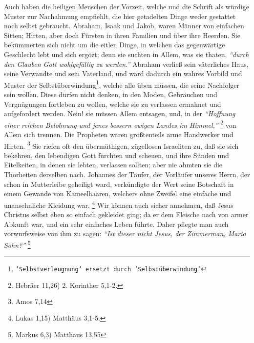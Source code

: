 Auch haben die heiligen Menschen der Vorzeit, welche und die Schrift als würdige
Muster zur Nachahmung empfiehlt, die hier getadelten Dinge weder gestattet noch
selbst gebraucht. Abraham, Isaak und Jakob, waren Männer von einfachen Sitten;
Hirten, aber doch Fürsten in ihren Familien und über ihre Heerden. Sie
bekümmerten sich nicht um die eitlen Dinge, in welchen das gegenwärtige
Geschlecht lebt und sich ergözt; denn sie suchten in Allem, was sie thaten,
\textit{"`durch den Glauben Gott wohlgefällig zu werden."'} Abraham verließ sein
väterliches Haus, seine Verwandte und sein Vaterland, und ward dadurch ein
wahres Vorbild und Muster der Selbstüberwindung\footnote{\texttt{'Selbstverleugnung' ersetzt durch 'Selbstüberwindung'}}, welche alle üben müssen, die
seine Nachfolger sein wollen. Diese dürfen nicht denken, in den Moden,
Gebräuchen und Vergnügungen fortleben zu wollen, welche sie zu verlassen
ermahnet und aufgefordert werden. Nein! sie müssen Allem entsagen, und, in der
\textit{"`Hoffnung einer reichen Belohnung und jenes bessern ewigen Landes im
Himmel,"'}
\footnote{Hebräer 11,26) 2. Korinther 5,1-2.}
von Allem sich trennen. Die
Propheten waren größtenteils arme Handwerker und Hirten.
\footnote{Amos 7,14}
Sie riefen oft den übermüthigen, zügellosen Israeliten zu, daß sie sich bekehren,
den lebendigen Gott fürchten und scheuen, und ihre
Sünden und Eitelkeiten, in
denen sie lebten, verlassen sollten; aber nie ahmten sie die Thorheiten
derselben nach. Johannes der Täufer, der Vorläufer unseres Herrn, der schon in
Mutterleibe geheiligt ward, verkündigte der Wert seine Botschaft in einem
Gewande von Kameelhaaren, welchers ohne Zweifel eine einfache und unansehnliche
Kleidung war.
\footnote{Lukas 1,15) Matthäus 3,1-5.}
Wir können auch sicher annehmen,
daß Jesus Christus selbst eben so einfach gekleidet ging; da er dem Fleische
nach von armer Abkunft war, und ein sehr einfaches Leben führte. Daher pflegte
man auch vorwurfsweise von ihm zu sagen:
\textit{"`Ist dieser nicht Jesus, der
Zimmerman, Maria Sohn?"'}
\footnote{Markus 6,3) Matthäus 13,55}
